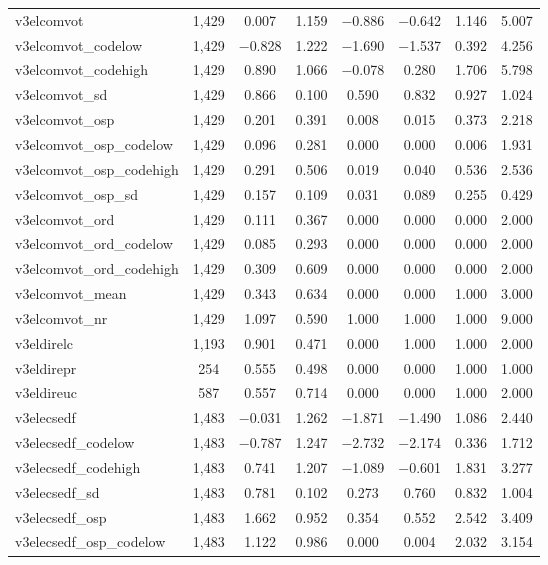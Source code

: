 \begin{table}[!htbp]
\begin{tabular}{@{\extracolsep{5pt}}lccccccc}
v3elcomvot & 1,429 & 0.007 & 1.159 & $-$0.886 & $-$0.642 & 1.146 & 5.007 \\ 
v3elcomvot\_codelow & 1,429 & $-$0.828 & 1.222 & $-$1.690 & $-$1.537 & 0.392 & 4.256 \\ 
v3elcomvot\_codehigh & 1,429 & 0.890 & 1.066 & $-$0.078 & 0.280 & 1.706 & 5.798 \\ 
v3elcomvot\_sd & 1,429 & 0.866 & 0.100 & 0.590 & 0.832 & 0.927 & 1.024 \\ 
v3elcomvot\_osp & 1,429 & 0.201 & 0.391 & 0.008 & 0.015 & 0.373 & 2.218 \\ 
v3elcomvot\_osp\_codelow & 1,429 & 0.096 & 0.281 & 0.000 & 0.000 & 0.006 & 1.931 \\ 
v3elcomvot\_osp\_codehigh & 1,429 & 0.291 & 0.506 & 0.019 & 0.040 & 0.536 & 2.536 \\ 
v3elcomvot\_osp\_sd & 1,429 & 0.157 & 0.109 & 0.031 & 0.089 & 0.255 & 0.429 \\ 
v3elcomvot\_ord & 1,429 & 0.111 & 0.367 & 0.000 & 0.000 & 0.000 & 2.000 \\ 
v3elcomvot\_ord\_codelow & 1,429 & 0.085 & 0.293 & 0.000 & 0.000 & 0.000 & 2.000 \\ 
v3elcomvot\_ord\_codehigh & 1,429 & 0.309 & 0.609 & 0.000 & 0.000 & 0.000 & 2.000 \\ 
v3elcomvot\_mean & 1,429 & 0.343 & 0.634 & 0.000 & 0.000 & 1.000 & 3.000 \\ 
v3elcomvot\_nr & 1,429 & 1.097 & 0.590 & 1.000 & 1.000 & 1.000 & 9.000 \\ 
v3eldirelc & 1,193 & 0.901 & 0.471 & 0.000 & 1.000 & 1.000 & 2.000 \\ 
v3eldirepr & 254 & 0.555 & 0.498 & 0.000 & 0.000 & 1.000 & 1.000 \\ 
v3eldireuc & 587 & 0.557 & 0.714 & 0.000 & 0.000 & 1.000 & 2.000 \\ 
v3elecsedf & 1,483 & $-$0.031 & 1.262 & $-$1.871 & $-$1.490 & 1.086 & 2.440 \\ 
v3elecsedf\_codelow & 1,483 & $-$0.787 & 1.247 & $-$2.732 & $-$2.174 & 0.336 & 1.712 \\ 
v3elecsedf\_codehigh & 1,483 & 0.741 & 1.207 & $-$1.089 & $-$0.601 & 1.831 & 3.277 \\ 
v3elecsedf\_sd & 1,483 & 0.781 & 0.102 & 0.273 & 0.760 & 0.832 & 1.004 \\ 
v3elecsedf\_osp & 1,483 & 1.662 & 0.952 & 0.354 & 0.552 & 2.542 & 3.409 \\ 
v3elecsedf\_osp\_codelow & 1,483 & 1.122 & 0.986 & 0.000 & 0.004 & 2.032 & 3.154 \\ 

\end{tabular}
\end{table}
